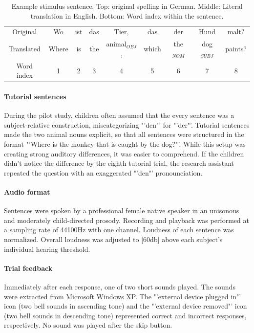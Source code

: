 \vspace{5mm}
\begin{table}[htb]
\begin{center}
\begin{tabular}{c|cccccccc}
Original & Wo & ist & das & Tier, & das & der & Hund & malt?\\
Translated & Where & is & the & animal$_{OBJ}$, & which & the$_{NOM}$ & dog$_{SUBJ}$ & paints?\\
Word index & 1 & 2 & 3 & 4 & 5 & 6 & 7 & 8
\end{tabular}
\caption{\label{3.1.sentences} Example stimulus sentence. Top: original spelling in German. Middle: Literal translation in English. Bottom: Word index within the sentence.}
\end{center}
\end{table}

\paragraph{Tutorial sentences}
During the pilot study, children often assumed that the every sentence was a subject-relative construction, miscategorizing "'den"' for "'der"'.
Tutorial sentences made the two animal nouns explicit, so that all sentences were structured in the format "'Where is the monkey that is caught by the dog?"'.
While this setup was creating strong auditory differences, it was easier to comprehend.
If the children didn't notice the difference by the eighth tutorial trial, the research assistant repeated the question with an exaggerated "'den"' pronounciation.

\paragraph{Audio format}
Sentences were spoken by a professional female native speaker in an unisonous and moderately child-directed prosody.
Recording and playback was performed at a sampling rate of 44100Hz with one channel.
Loudness of each sentence was normalized.
Overall loudness was adjusted to [60db] above each subject's individual hearing threshold.

\paragraph{Trial feedback}
Immediately after each response, one of two short sounds played.
The sounds were extracted from Microsoft Windows XP.
The "'external device plugged in"' icon (two bell sounds in ascending tone) and the "'external device removed"' icon (two bell sounds in descending tone) represented correct and incorrect responses, respectively.
No sound was played after the skip button.


